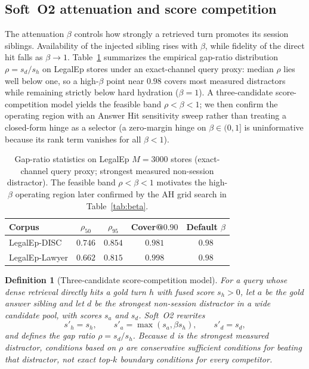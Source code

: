 \documentclass[preprint,12pt,authoryear]{elsarticle}
\newtheorem{definition}{Definition}
\newcommand{\compacttab}{\setlength{\tabcolsep}{4.5pt}\renewcommand{\arraystretch}{1.05}}
\begin{document}
\subsection{Soft~O2 attenuation and score competition}\label{sec:beta-theory}

The attenuation $\beta$ controls how strongly a retrieved turn promotes its session siblings.
Availability of the injected sibling rises with $\beta$, while fidelity of the direct hit falls as $\beta\to 1$.
Table~\ref{tab:beta-theory} summarizes the empirical gap-ratio distribution $\rho=s_d/s_h$ on LegalEp stores under an exact-channel query proxy: median $\rho$ lies well below one, so a high-$\beta$ point near $0.98$ covers most measured distractors while remaining strictly below hard hydration ($\beta{=}1$).
A three-candidate score-competition model yields the feasible band $\rho{<}\beta{<}1$; we then confirm the operating region with an Answer Hit sensitivity sweep rather than treating a closed-form hinge as a selector (a zero-margin hinge on $\beta\in(0,1]$ is uninformative because its rank term vanishes for all $\beta<1$).

\begin{table}[t]
\centering
\caption{Gap-ratio statistics on LegalEp $M{=}3000$ stores (exact-channel query proxy; strongest measured non-session distractor). The feasible band $\rho{<}\beta{<}1$ motivates the high-$\beta$ operating region later confirmed by the AH grid search in Table~\ref{tab:beta}.}
\label{tab:beta-theory}
\compacttab\footnotesize
\begin{tabular}{@{}lcccc@{}}
\toprule
\textbf{Corpus} & $\rho_{50}$ & $\rho_{95}$ & Cover@$0.90$ & Default $\beta$ \\
\midrule
LegalEp-DISC & $0.746$ & $0.854$ & $0.981$ & $0.98$ \\
LegalEp-Lawyer & $0.662$ & $0.815$ & $0.998$ & $0.98$ \\
\bottomrule
\end{tabular}
\end{table}


\begin{definition}[Three-candidate score-competition model]\label{def:three-cand}
For a query whose dense retrieval directly hits a gold turn $h$ with fused score $s_h>0$, let $a$ be the gold answer sibling and let $d$ be the strongest non-session distractor in a wide candidate pool, with scores $s_a$ and $s_d$.
Soft~O2 rewrites
\begin{equation}\label{eq:soft-rewrite}
s'_h=s_h,\qquad s'_a=\max(s_a,\beta s_h),\qquad s'_d=s_d,
\end{equation}
and defines the gap ratio $\rho=s_d/s_h$.
Because $d$ is the strongest measured distractor, conditions based on $\rho$ are conservative sufficient conditions for beating that distractor, not exact top-$k$ boundary conditions for every competitor.
\end{definition}
\end{document}
